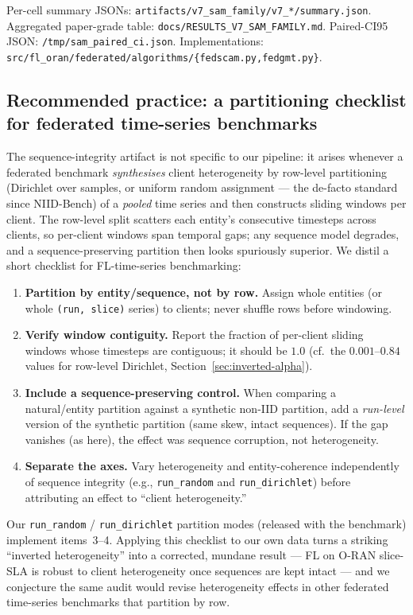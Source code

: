 \documentclass[journal]{IEEEtran}
\begin{document}
Per-cell summary JSONs: \lstinline|artifacts/v7_sam_family/v7_*/summary.json|. Aggregated paper-grade table: \lstinline|docs/RESULTS_V7_SAM_FAMILY.md|. Paired-CI95 JSON: \lstinline|/tmp/sam_paired_ci.json|. Implementations: \lstinline|src/fl_oran/federated/algorithms/{fedscam.py,fedgmt.py}|.


\subsection{Recommended practice: a partitioning checklist for federated time-series benchmarks}\label{sec:checklist}

The sequence-integrity artifact is not specific to our pipeline: it arises whenever a federated benchmark \emph{synthesises} client heterogeneity by row-level partitioning (Dirichlet over samples, or uniform random assignment --- the de-facto standard since NIID-Bench) of a \emph{pooled} time series and then constructs sliding windows per client. The row-level split scatters each entity's consecutive timesteps across clients, so per-client windows span temporal gaps; any sequence model degrades, and a sequence-preserving partition then looks spuriously superior. We distil a short checklist for FL-time-series benchmarking:

\begin{enumerate}
  \item \textbf{Partition by entity/sequence, not by row.} Assign whole entities (or whole \lstinline|(run, slice)| series) to clients; never shuffle rows before windowing.
  \item \textbf{Verify window contiguity.} Report the fraction of per-client sliding windows whose timesteps are contiguous; it should be $1.0$ (cf.\ the $0.001$--$0.84$ values for row-level Dirichlet, Section~\ref{sec:inverted-alpha}).
  \item \textbf{Include a sequence-preserving control.} When comparing a natural/entity partition against a synthetic non-IID partition, add a \emph{run-level} version of the synthetic partition (same skew, intact sequences). If the gap vanishes (as here), the effect was sequence corruption, not heterogeneity.
  \item \textbf{Separate the axes.} Vary heterogeneity and entity-coherence independently of sequence integrity (e.g., \lstinline|run_random| and \lstinline|run_dirichlet|) before attributing an effect to ``client heterogeneity.''
\end{enumerate}

Our \lstinline|run_random| / \lstinline|run_dirichlet| partition modes (released with the benchmark) implement items~3--4. Applying this checklist to our own data turns a striking ``inverted heterogeneity'' into a corrected, mundane result --- FL on O-RAN slice-SLA is robust to client heterogeneity once sequences are kept intact --- and we conjecture the same audit would revise heterogeneity effects in other federated time-series benchmarks that partition by row.
\end{document}

